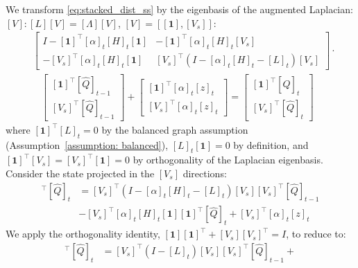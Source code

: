 \documentclass[journal]{IEEEtran}
\begin{document}
\begin{IEEEproof}
    We transform \eqref{eq:stacked_dist_ss} by the eigenbasis of the augmented Laplacian: $[V]: [L][V] = [\Lambda] [V]$, $[V] = [ [\boldsymbol{1}], [V_s]]$:
    \begin{align*}
        &    
        \begin{bmatrix} 
            I - [\boldsymbol{1}]^\intercal [\alpha]_t [H]_t [\boldsymbol{1}] & -[\boldsymbol{1}]^\intercal [\alpha]_t [H]_t [V_s] \\
            - [V_s]^\intercal [\alpha]_t [H]_t [\boldsymbol{1}] & [V_s]^\intercal ( I - [\alpha]_t [H]_t - [L]_t) [V_s] 
        \end{bmatrix} \cdot \\ 
        & \ \ \ \ \begin{bmatrix}
            [\boldsymbol{1}]^\intercal [\hat{Q}]_{t-1} \\ [V_s]^\intercal [\hat{Q}]_{t-1}
        \end{bmatrix} 
        + \begin{bmatrix}
            [\boldsymbol{1}]^\intercal [\alpha]_t [z]_t \\ [V_s]^\intercal [\alpha]_t [z]_t
        \end{bmatrix}= \begin{bmatrix}
            [\boldsymbol{1}]^\intercal [\hat{Q}]_{t} \\ [V_s]^\intercal [\hat{Q}]_{t}
        \end{bmatrix}
    \end{align*}
    where $[\boldsymbol{1}]^\intercal [L]_t = 0$ by the balanced graph assumption (Assumption~\ref{assumption: balanced}), $[L]_t [\boldsymbol{1}] = 0$ by definition, and $[\boldsymbol{1}]^\intercal [V_s] = [V_s]^\intercal [\boldsymbol{1}] = 0$ by orthogonality of the Laplacian eigenbasis. \newline
    Consider the state projected in the $[V_s]$ directions:
    \begin{align*}
        [V_s]^\intercal [\hat{Q}]_t &= [V_s]^\intercal ( I - [\alpha]_t [H]_t - [L]_t)[V_s][V_s]^\intercal [\hat{Q}]_{t-1} \\  
        & -[V_s]^\intercal [\alpha]_t [H]_t [\boldsymbol{1}] [\boldsymbol{1}]^\intercal [\hat{Q}]_t + [V_s]^\intercal [\alpha]_t [z]_t
    \end{align*}
    We apply the orthogonality identity, $ [\boldsymbol{1}] [\boldsymbol{1}]^\intercal + [V_s] [V_s]^\intercal = I$, to reduce to:
    \begin{align*}
        [V_s]^\intercal [\hat{Q}]_{t} &= [V_s]^\intercal ( I - [L]_t) [V_s] [V_s]^\intercal [\hat{Q}]_{t-1} + \\

\end{align*}
\end{IEEEproof}
\end{document}
